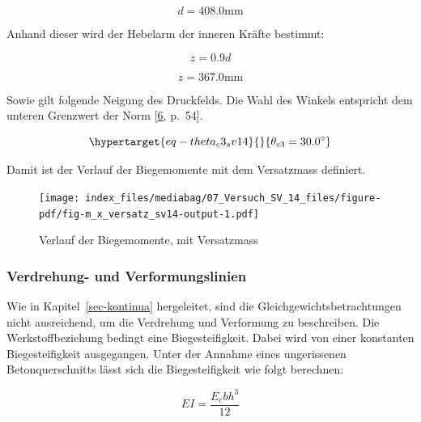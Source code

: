\documentclass[
  12pt,
  letterpaper,
  egregdoesnotlikesansseriftitles]{scrreprt}
\begin{document}
\begin{equation}d = 408.0 \text{mm}\end{equation}

Anhand dieser wird der Hebelarm der inneren Kräfte bestimmt:

\begin{equation}z = 0.9 d\end{equation}

\begin{equation}z = 367.0 \text{mm}\end{equation}

Sowie gilt folgende Neigung des Druckfelds. Die Wahl des Winkels
entspricht dem unteren Grenzwert der Norm
{[}\protect\hyperlink{ref-SIA2013a}{6}, p.~54{]}.

\begin{equation}\protect\hypertarget{eq-theta_c3_sv14}{}{
 \theta_{c3} = 30.0^{\circ}
}\label{eq-theta_c3_sv14}\end{equation}

Damit ist der Verlauf der Biegemomente mit dem Versatzmass definiert.

\begin{figure}[H]

{\centering \texttt{[image: index\_files/mediabag/07\_Versuch\_SV\_14\_files/figure-pdf/fig-m\_x\_versatz\_sv14-output-1.pdf]}

}

\caption{\label{fig-m_x_versatz_sv14}Verlauf der Biegemomente, mit
Versatzmass}

\end{figure}

\hypertarget{verdrehung--und-verformungslinien-1}{%
\subsubsection{Verdrehung- und
Verformungslinien}\label{verdrehung--und-verformungslinien-1}}

Wie in Kapitel~\ref{sec-kontinua} hergeleitet, sind die
Gleichgewichtsbetrachtungen nicht ausreichend, um die Verdrehung und
Verformung zu beschreiben. Die Werkstoffbeziehung bedingt eine
Biegesteifigkeit. Dabei wird von einer konstanten Biegesteifigkeit
ausgegangen. Unter der Annahme eines ungerissenen Betonquerschnitts
lässt sich die Biegesteifigkeit wie folgt berechnen:

\begin{equation}EI = \frac{E_{c} b h^{3}}{12}\end{equation}
\end{document}
